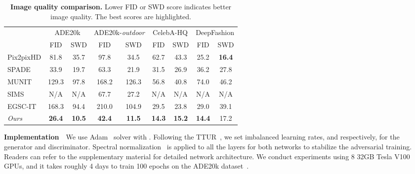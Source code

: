 \documentclass[10pt,twocolumn,letterpaper]{article}
\begin{document}
\begin{table}[!t]
    \footnotesize
    \centering 
    \setlength\tabcolsep{2.5pt}
    \caption{\textbf{Image quality comparison.} Lower FID or SWD score indicates better image quality. The best scores are highlighted.}
    \begin{tabular}{@{}lcccccccc@{}}
    \toprule
    \multirow{2}{*}{} & \multicolumn{2}{c}{ADE20k} & \multicolumn{2}{c}{ADE20k-\emph{outdoor}} & \multicolumn{2}{c}{CelebA-HQ} & \multicolumn{2}{c}{DeepFashion}\\
    \cmidrule(lr){2-3} 
    \cmidrule(lr){4-5} 
    \cmidrule(lr){6-7} 
    \cmidrule(lr){8-9} 
     & FID & SWD & FID & SWD & FID & SWD & FID & SWD\\ \midrule
     Pix2pixHD & 81.8 & 35.7 & 97.8 & 34.5 & 62.7 & 43.3 & 25.2 & \textbf{16.4}\\
     SPADE & 33.9 & 19.7 & 63.3 & 21.9 & 31.5 & 26.9 & 36.2 & 27.8\\
     MUNIT & 129.3 & 97.8 & 168.2 & 126.3 & 56.8 & 40.8 & 74.0 & 46.2\\
     SIMS & N/A & N/A & 67.7 & 27.2 & N/A & N/A & N/A & N/A \\
     EGSC-IT & 168.3 & 94.4 & 210.0 & 104.9 & 29.5 & 23.8  & 29.0 & 39.1\\
     \emph{Ours} & \textbf{26.4} & \textbf{10.5} & \textbf{42.4} & \textbf{11.5} & \textbf{14.3} & \textbf{15.2} & \textbf{14.4} & 17.2\\
     \bottomrule
    \end{tabular}
    \label{table:image_quality}
\end{table}


\noindent\textbf{Implementation}~~We use Adam~\cite{kingma2014adam} solver with . Following the TTUR~\cite{heusel2017gans}, we set imbalanced learning rates,  and  respectively, for the generator and discriminator. Spectral normalization~\cite{miyato2018spectral} is applied to all the layers for both networks to stabilize the adversarial training. Readers can refer to the supplementary material for detailed network architecture. We conduct experiments using 8 32GB Tesla V100 GPUs, and it takes roughly 4 days to train 100 epochs on the ADE20k dataset~\cite{zhou2017scene}.   
\end{document}
